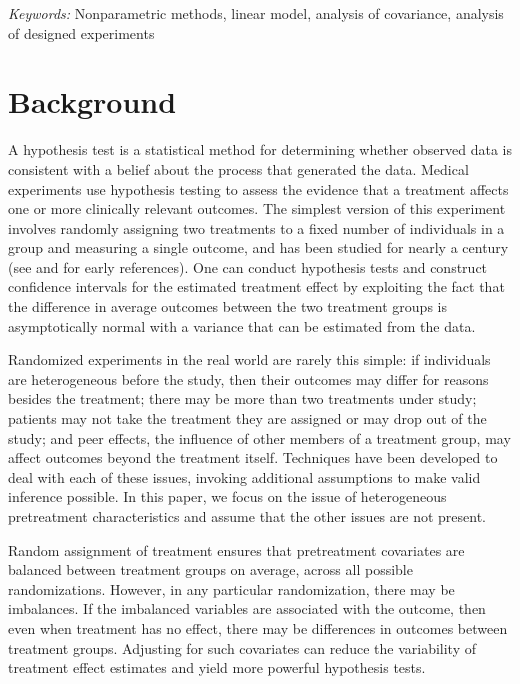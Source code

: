 \documentclass[12pt]{article}
\begin{document}
\noindent%
{\it Keywords:}  Nonparametric methods, linear model, analysis of covariance, analysis of designed experiments
\vfill

\newpage
{} %
\section{Background}
A hypothesis test is a statistical method for determining whether observed data is consistent with a belief about the process that generated the data.
Medical experiments use hypothesis testing to assess the evidence that a treatment affects one or more clinically relevant outcomes.
The simplest version of this experiment involves randomly assigning two treatments to a fixed number of individuals in a group and measuring a single outcome, and has been studied for nearly a century (see \cite{fisher_design_1935} and \cite[1990 translation]{neyman_application_1923} for early references).
One can conduct hypothesis tests and construct confidence intervals for the estimated treatment effect
by exploiting the fact that the difference in average outcomes between the two treatment groups is asymptotically normal with a variance that can be estimated from the data.

Randomized experiments in the real world are rarely this simple:
if individuals are heterogeneous before the study, then their outcomes may differ for reasons besides the treatment;
there may be more than two treatments under study;
patients may not take the treatment they are assigned or may drop out of the study;
and peer effects, the influence of other members of a treatment group, may affect outcomes beyond the treatment itself.
Techniques have been developed to deal with each of these issues, invoking additional assumptions to make valid inference possible.
In this paper, we focus on the issue of heterogeneous pretreatment characteristics and assume that the other issues are not present.

Random assignment of treatment ensures that pretreatment covariates are balanced between treatment groups on average, across all possible randomizations.
However, in any particular randomization, there may be imbalances.
If the imbalanced variables are associated with the outcome, then even when treatment has no effect, there may be differences in outcomes between treatment groups.
Adjusting for such covariates can reduce the variability of treatment effect estimates and yield more powerful hypothesis tests.
\end{document}
